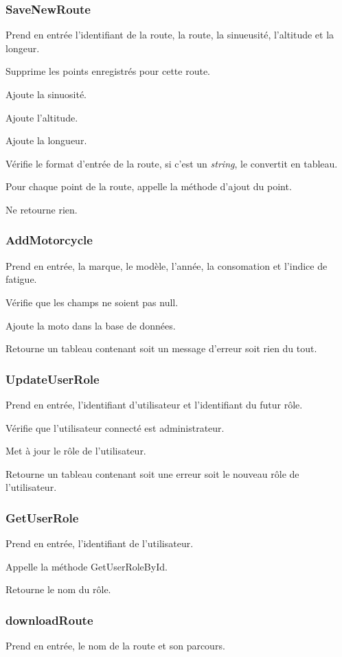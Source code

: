 \documentclass[a4paper]{article}
\newcommand{\bdd}{base de données}
\begin{document}
\subsubsection{SaveNewRoute}
Prend en entrée l'identifiant de la route, la route, la sinueusité, l'altitude et la longeur.

Supprime les points enregistrés pour cette route.

Ajoute la sinuosité.

Ajoute l'altitude.

Ajoute la longueur.

Vérifie le format d'entrée de la route, si c'est un \emph{string}, le convertit en tableau.

Pour chaque point de la route, appelle la méthode d'ajout du point.

Ne retourne rien.

\subsubsection{AddMotorcycle}
Prend en entrée, la marque, le modèle, l'année, la consomation et l'indice de fatigue.

Vérifie que les champs ne soient pas null.

Ajoute la moto dans la \bdd.

Retourne un tableau contenant soit un message d'erreur soit rien du tout.

\subsubsection{UpdateUserRole}
Prend en entrée, l'identifiant d'utilisateur et l'identifiant du futur rôle.

Vérifie que l'utilisateur connecté est administrateur.

Met à jour le rôle de l'utilisateur.

Retourne un tableau contenant soit une erreur soit le nouveau rôle de l'utilisateur.

\subsubsection{GetUserRole}
Prend en entrée, l'identifiant de l'utilisateur.

Appelle la méthode GetUserRoleById.

Retourne le nom du rôle.

\subsubsection{downloadRoute}
Prend en entrée, le nom de la route et son parcours.
\end{document}
